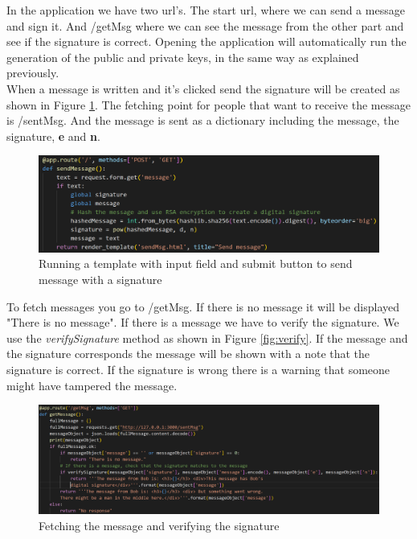 \documentclass[12pt, letterpaper]{article}
\begin{document}
In the application we have two url's. The start url, where we can send a message and sign it. And /getMsg where we can see the message from the other part and see if the signature is correct. Opening the application will automatically run the generation of the public and private keys, in the same way as explained previously. \\

When a message is written and it's clicked send the signature will be created as shown in Figure \ref{fig:send}. The fetching point for people that want to receive the message is /sentMsg. And the message is sent as a dictionary including the message, the signature, \textbf{e} and \textbf{n}.
 
\begin{figure}[H]
  \includegraphics[width=\linewidth]{code_snippets/send.PNG}\centering
  \caption{Running a template with input field and submit button to send message with a signature}
  \label{fig:send}
\end{figure}

To fetch messages you go to /getMsg. If there is no message it will be displayed "There is no message". If there is a message we have to verify the signature. We use the \textit{verifySignature} method as shown in Figure \ref{fig:verify}. If the message and the signature corresponds the message will be shown with a note that the signature is correct. If the signature is wrong there is a warning that someone might have tampered the message.
 
\begin{figure}[H]
  \hspace*{-50px}\includegraphics[width=500px]{code_snippets/get.PNG}\centering
  \caption{Fetching the message and verifying the signature}
  \label{fig:get}
\end{figure} 
\end{document}
